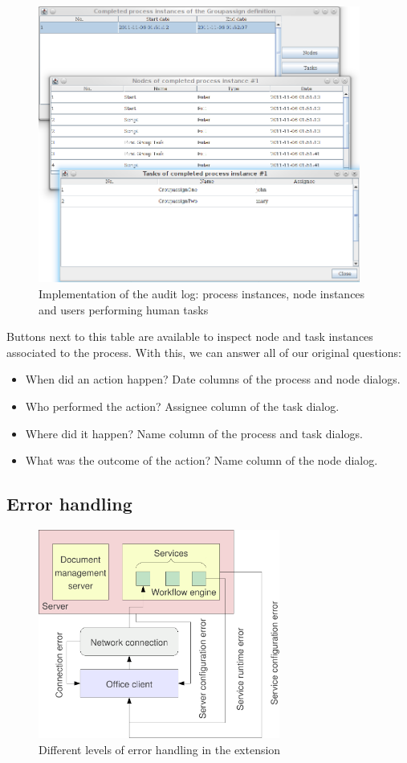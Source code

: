 \begin{figure}[H]
\centering
\includegraphics[width=400px,keepaspectratio]{implementation-auditlog.png}
\caption{Implementation of the audit log: process instances, node instances and users performing human tasks}
\label{fig:implementation-auditlog}
\end{figure}

Buttons next to this table are available to inspect node and task instances
associated to the process. With this, we can answer all of our original
questions:

\begin{itemize}
\item When did an action happen? Date columns of the process and node dialogs.
\item Who performed the action? Assignee column of the task dialog.
\item Where did it happen? Name column of the process and task dialogs.
\item What was the outcome of the action? Name column of the node dialog.
\end{itemize}

\subsection{Error handling}

\begin{figure}[H]
\centering
\includegraphics[width=300px,keepaspectratio]{error-levels.pdf}
\caption{Different levels of error handling in the extension}
\label{fig:error-levels}
\end{figure}

